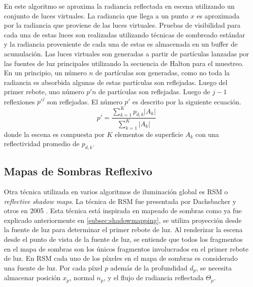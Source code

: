 En este algoritmo se aproxima la radiancia reflectada en escena utilizando un conjunto de luces virtuales. La radiancia que llega a un punto $x$ es aproximada por la radiancia que proviene de las luces virtuales. Pruebas de visibilidad para cada una de estas luces son realizadas utilizando técnicas de sombreado estándar y la radiancia proveniente de cada una de estas es almacenada en un buffer de acumulación.
Las luces virtuales son generadas a partir de partículas lanzadas por las fuentes de luz principales utilizando la secuencia de Halton para el muestreo. En un principio, un número $n$ de partículas son generadas, como no toda la radiancia es absorbida algunas de estas partículas son reflejadas. Luego del primer rebote, uno número $p'n$ de partículas son reflejadas. Luego de $j-1$ reflexiones $p'^j$ son reflejadas. El número $p'$ es descrito por la siguiente ecuación.
\begin{equation}
    p' = \frac{\sum_{k=1}^{K} p_{d,k}|A_{k}|}{\sum_{k=1}^{K}|A_{k}|}
    \label{eq:reflected_vpls}
\end{equation} donde la escena es compuesta por $K$ elementos de superficie $A_{k}$ con una reflectividad promedio de $p_{d,k}$.

\subsection{Mapas de Sombras Reflexivo}
Otra técnica utilizada en varios algoritmos de iluminación global es \ac{RSM} o \emph{reflective shadow maps}. La técnica de \ac{RSM} fue presentada por Dachsbacher y otros en 2005 \cite{Dachsbacher:2005}.  Esta técnica está inspirada en mapeado de sombras como ya fue explicado anteriormente en \ref{subsec:shadowmapping}, se utiliza proyección desde la fuente de luz para determinar el primer rebote de luz. Al renderizar la escena desde el punto de vista de la fuente de luz, se entiende que todos los fragmentos en el mapa de sombras son los únicos fragmentos involucrados en el primer rebote de luz. En \ac{RSM} cada uno de los píxeles en el mapa de sombras es considerado una fuente de luz. Por cada píxel $p$ además de la profundidad $d_{p}$, se necesita almacenar posición $x_{p}$, normal $n_{p}$, y el flujo de radiancia reflectada $\Theta_{p}$.

